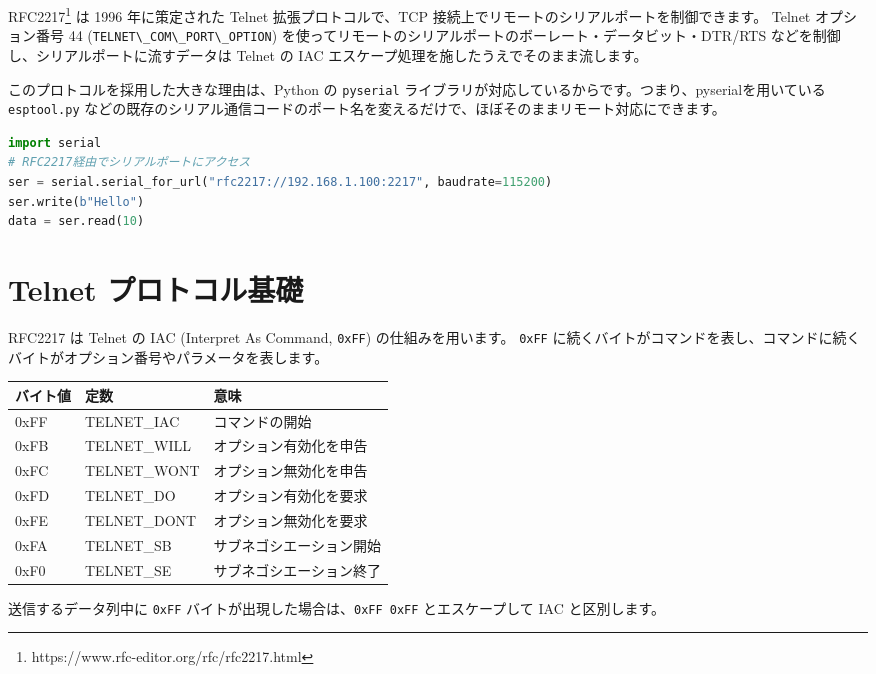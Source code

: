 \documentclass[10pt,twoside,openany,a4j]{ltjsbook}
\newcommand{\passthrough}[1]{#1}
\begin{document}
RFC2217\footnote{https://www.rfc-editor.org/rfc/rfc2217.html} は 1996
年に策定された Telnet 拡張プロトコルで、TCP
接続上でリモートのシリアルポートを制御できます。 Telnet オプション番号
44 (\passthrough{\lstinline!TELNET\_COM\_PORT\_OPTION!})
を使ってリモートのシリアルポートのボーレート・データビット・DTR/RTS
などを制御し、シリアルポートに流すデータは Telnet の IAC
エスケープ処理を施したうえでそのまま流します。

このプロトコルを採用した大きな理由は、Python の
\passthrough{\lstinline!pyserial!}
ライブラリが対応しているからです。つまり、pyserialを用いている
\passthrough{\lstinline!esptool.py!}
などの既存のシリアル通信コードのポート名を変えるだけで、ほぼそのままリモート対応にできます。

\begin{lstlisting}[language=Python]
import serial
# RFC2217経由でシリアルポートにアクセス
ser = serial.serial_for_url("rfc2217://192.168.1.100:2217", baudrate=115200)
ser.write(b"Hello")
data = ser.read(10)
\end{lstlisting}

\section{Telnet
プロトコル基礎}\label{telnet-ux30d7ux30edux30c8ux30b3ux30ebux57faux790e}

RFC2217 は Telnet の IAC (Interpret As Command,
\passthrough{\lstinline!0xFF!}) の仕組みを用います。
\passthrough{\lstinline!0xFF!}
に続くバイトがコマンドを表し、コマンドに続くバイトがオプション番号やパラメータを表します。

\begin{longtable}[]{@{}lll@{}}
\toprule\noalign{}
バイト値 & 定数 & 意味 \\
\midrule\noalign{}
\endhead
\bottomrule\noalign{}
\endlastfoot
0xFF & TELNET\_IAC & コマンドの開始 \\
0xFB & TELNET\_WILL & オプション有効化を申告 \\
0xFC & TELNET\_WONT & オプション無効化を申告 \\
0xFD & TELNET\_DO & オプション有効化を要求 \\
0xFE & TELNET\_DONT & オプション無効化を要求 \\
0xFA & TELNET\_SB & サブネゴシエーション開始 \\
0xF0 & TELNET\_SE & サブネゴシエーション終了 \\
\end{longtable}

送信するデータ列中に \passthrough{\lstinline!0xFF!}
バイトが出現した場合は、\passthrough{\lstinline!0xFF 0xFF!}
とエスケープして IAC と区別します。
\end{document}
